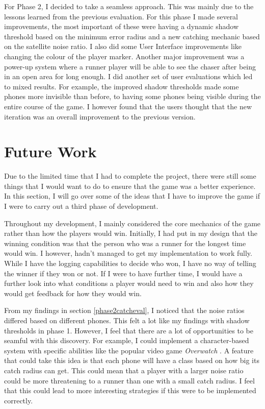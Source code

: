 \documentclass{l4proj}
\begin{document}
For Phase 2, I decided to take a seamless approach. This was mainly due to the lessons learned from the previous
evaluation. For this phase I made several improvements, the most important of these were having a dynamic shadow
threshold based on the minimum error radius and a new catching mechanic based on the satellite noise ratio. I
also did some User Interface improvements like changing the colour of the player marker. Another major improvement
was a power-up system where a runner player will be able to see the chaser after being in an open area for long enough.
I did another set of user evaluations which led to mixed results. For example, the improved shadow thresholds made some
phones more invisible than before, to having some phones being visible during the entire course of the game. I however
found that the users thought that the new iteration was an overall improvement to the previous version.

\section{Future Work}
Due to the limited time that I had to complete the project, there were still some things that I would want to do
to ensure that the game was a better experience. In this section, I will go over some of the ideas
that I have to improve the game if I were to carry out a third phase of development.

Throughout my development, I mainly considered the core mechanics of the game rather than how the players would win.
Initially, I had put in my design that the winning condition was that the person who was a runner for the longest time
would win. I however, hadn't managed to get my implementation to work fully. While I have the logging capabilities to
decide who won, I have no way of telling the winner if they won or not. If I were to have further time, I would have a
further look into what conditions a player would need to win and also how they would get feedback for how they would win.

From my findings in section \ref{phase2catcheval}, I noticed that the noise ratios differed based on different phones.
This felt a lot like my findings with shadow thresholds in phase 1. However, I feel that there are a lot of opportunities
to be seamful with this discovery. For example, I could implement a character-based system with specific abilities like the
popular video game \emph{Overwatch} \citep{overwatch}. A feature that could take this idea is that each phone will have
a class based on how big its catch radius can get. This could mean that a player with a larger noise ratio could be more
threatening to a runner than one with a small catch radius. I feel that this could lead to more interesting strategies if
this were to be implemented correctly.
\end{document}
